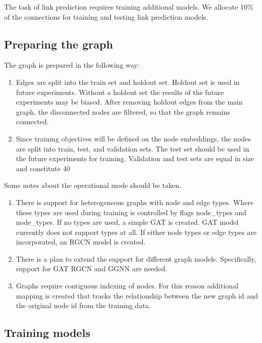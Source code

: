 \documentclass[a4paper,twoside]{article}
\begin{document}
The task of link prediction requires training additional models. We allocate 10\% of the connections for training and testing link prediction models.

\subsection{Preparing the graph}
The graph is prepared in the following way:
\begin{enumerate}
    \item Edges are split into the train set and holdout set. Holdout set is used in future experiments. Without a holdout set the results of the future experiments may be biased. After removing holdout edges from the main graph, the disconnected nodes are filtered, so that the graph remains connected.
    \item Since training objectives will be defined on the node embeddings, the nodes are split into train, test, and validation sets. The test set should be used in the future experiments for training. Validation and test sets are equal in size and constitute 40%
\end{enumerate}

Some notes about the operational mode should be taken. 
\begin{enumerate}
    \item There is support for heterogeneous graphs with node and edge types. Where these types are used during training is controlled by flags node\_types and node\_types. If no types are used, a simple GAT is created. GAT model currently does not support types at all. If either node types or edge types are incorporated, an RGCN model is created. 
    \item There is a plan to extend the support for different graph models. Specifically, support for  GAT RGCN and GGNN are needed. 
    \item Graphs require contiguous indexing of nodes. For this reason additional mapping is created that tracks the relationship between the new graph id and the original node id from the training data.
\end{enumerate}

\subsection{Training models}
\end{document}
